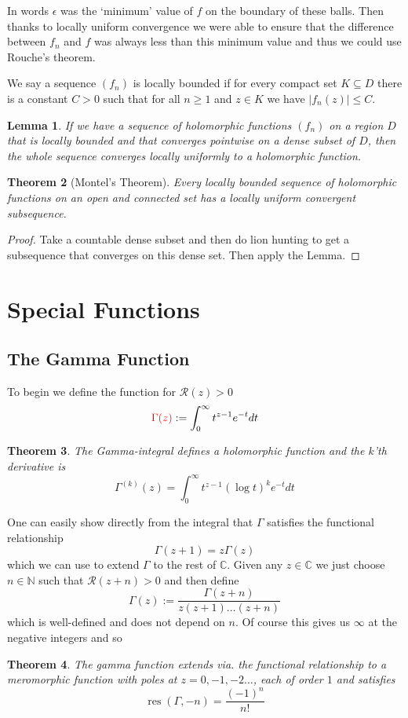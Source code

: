 \documentclass[11pt]{article}
\newcommand{\defeq}{:=}
\newcommand{\abs}[1]{\left|#1\right|}
\DeclareMathOperator{\res}{\text{res}}
\newcommand{\C}{\mathbb{C}}
\newcommand{\N}{\mathbb{N}}
\newenvironment{defin}
	{\begin{mdframed}[backgroundcolor=white, roundcorner=5pt, linewidth=1pt]}
	{\end{mdframed}}
\newcommand{\mdf}[1]{{\color{red} #1}}
\newtheorem{theorem}{Theorem}[section]
\newtheorem{lemma}[theorem]{Lemma}
\begin{document}
In words $\epsilon$ was the `minimum' value of $f$ on the boundary of these balls.
Then thanks to locally uniform convergence we were able to ensure that the difference between $f_n$ and $f$ was always less than this minimum value and thus we could use Rouche's theorem.

We say a sequence $(f_n)$ is \mdf{locally bounded} if for every compact set $K\subseteq D$ there is a constant $C > 0$ such that for all $n\geq 1$ and $z\in K$ we have $\abs{f_n(z)} \leq C$.

\begin{lemma}
If we have a sequence of holomorphic functions $(f_n)$ on a region $D$ that is locally bounded and that converges pointwise on a dense subset of $D$, then the whole sequence converges locally uniformly to a holomorphic function.
\end{lemma}

\begin{theorem}[Montel's Theorem]
Every locally bounded sequence of holomorphic functions on an open and connected set has a locally uniform convergent subsequence.
\end{theorem}

\begin{proof}
Take a countable dense subset and then do lion hunting to get a subsequence that converges on this dense set.
Then apply the Lemma.
\end{proof}

\section{Special Functions}

\subsection{The Gamma Function}
\begin{defin}
	To begin we define the function for $\mathcal{R}(z)> 0$
	\[
		\mdf{\Gamma(z)}\defeq\int_0^\infty t^{z-1}e^{-t}dt
	\]
\end{defin}

\begin{theorem}
The Gamma-integral defines a holomorphic function and the $k$'th derivative is
\[
	\Gamma^{(k)}(z)=\int_0^\infty t^{z-1}(\log t)^k e^{-t}dt
\]
\end{theorem}
One can easily show directly from the integral that $\Gamma$ satisfies the functional relationship
\[
	\Gamma(z+1)=z\Gamma(z)
\]
which we can use to extend $\Gamma$ to the rest of $\C$.
Given any $z\in\C$ we just choose $n\in\N$ such that $\mathcal{R}(z+n)>0$ and then define
\[
	\Gamma(z)\defeq\frac{\Gamma(z+n)}{z(z+1)\dots(z+n)}
\]
which is well-defined and does not depend on $n$.
Of course this gives us $\infty$ at the negative integers and so
\begin{theorem}
The gamma function extends via. the functional relationship to a meromorphic function with poles at $z=0, -1, -2 \dots$, each of order $1$ and satisfies
\[
	\res(\Gamma, -n)=\frac{(-1)^n}{n!}
\]
\end{theorem}
\end{document}
